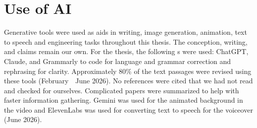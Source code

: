 \section{Use of AI}\label{sec:use-of-ai}
Generative  tools were used as aids in writing, image generation, animation, text to speech and engineering tasks throughout this thesis.
The conception, writing, and claims remain our own.
For the thesis, the following s were used: ChatGPT, Claude, and Grammarly to code for language and grammar correction and rephrasing for clarity.
Approximately 80\% of the text passages were revised using these tools (February~\textthreequartersemdash~June 2026).
No references were cited that we had not read and checked for ourselves.
Complicated papers were summarized to help with faster information gathering.
Gemini was used for the animated background in the video and ElevenLabs was used for converting text to speech for the voiceover (June 2026).
